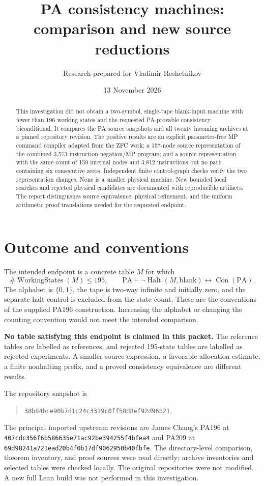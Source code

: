 \documentclass[11pt,letterpaper]{article}
\title{PA consistency machines:\\comparison and new source reductions}
\author{Research prepared for Vladimir Reshetnikov}
\date{13 November 2026}
\newcommand{\PA}{\mathrm{PA}}
\newcommand{\Con}{\operatorname{Con}}
\newcommand{\Halt}{\operatorname{Halt}}
\begin{document}
\maketitle
\begin{abstract}
This investigation did not obtain a two-symbol, single-tape blank-input
machine with fewer than 196 working states and the requested PA-provable
consistency biconditional. It compares the PA source snapshots and all twenty
incoming archives at a pinned repository revision. The positive results are
an explicit parameter-free MP command compiler adapted from the ZFC work;
a 157-node source representation of the combined 3,573-instruction
negation/MP program; and a source representation with the same count of 159
internal nodes and 3,812 instructions but no path containing six consecutive
zeros. Independent finite control-graph checks verify the two representation
changes. None is a smaller physical machine. New bounded local searches and
rejected physical candidates are documented with reproducible artifacts.
The report distinguishes source equivalence, physical refinement, and the
uniform arithmetic proof translations needed for the requested endpoint.
\end{abstract}

\section{Outcome and conventions}

The intended endpoint is a concrete table $M$ for which
\[
 \#\operatorname{WorkingStates}(M)\le195,
 \qquad \PA\vdash\neg\Halt(M,\text{blank})\leftrightarrow\Con(\PA).
\]
The alphabet is $\{0,1\}$, the tape is two-way infinite and initially zero,
and the separate halt control is excluded from the state count. These are
the conventions of the supplied PA196 construction. Increasing the alphabet
or changing the counting convention would not meet the intended comparison.

\textbf{No table satisfying this endpoint is claimed in this packet.}
The reference tables are labelled as references, and rejected 195-state
tables are labelled as rejected experiments. A smaller source expression,
a favorable allocation estimate, a finite nonhalting prefix, and a proved
consistency equivalence are different results.

The repository snapshot is
\begin{quote}\small
\nolinkurl{38b84bce90b7d1c24c3319c0ff58d8ef92d96b21}.
\end{quote}
The principal imported upstream revisions are James Chang's PA196 at
\nolinkurl{407cdc356f6b586635e71ac92be394255f4bfea4} and PA209 at
\nolinkurl{69d98241a721ead20b4f0b17df9062950b40fbfe}.
The directory-level comparison, theorem inventory, and proof sources were
read directly; archive inventories and selected tables were checked locally.
The original repositories were not modified. A new full Lean build was not
performed in this investigation.
\end{document}
